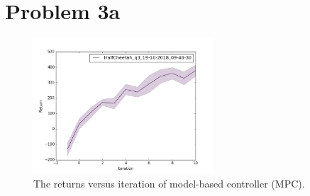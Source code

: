 \documentclass[12pt]{article}
\newcounter{question}
\begin{document}
	\pagebreak
	
	\section{Problem 3a}
	\begin{figure}[!htbp] 
		\includegraphics[width=0.6\textwidth]{question3a.png}
		\caption[caption]{
			The returns versus iteration of model-based controller (MPC).
		}\label{fig:q3a}
	\end{figure}

  \pagebreak
	
\end{document}

